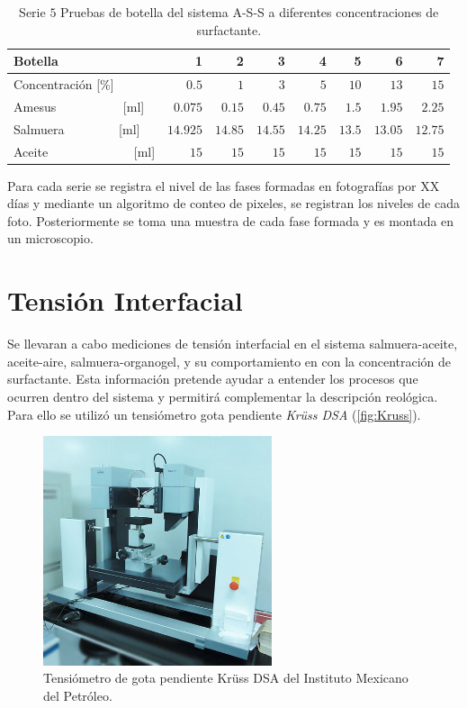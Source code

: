  \begin{table}[H]
    \caption[Pruebas de botella]{Serie $5$ Pruebas de botella del sistema A-S-S a diferentes concentraciones de surfactante.}
    \centering \footnotesize
    \begin{tabulary}{1.1\textwidth}{L |R|R|R|R|R|R|R}
        \toprule
        Botella & \textbf{1} & \textbf{2} & \textbf{3} & \textbf{4} & \textbf{5} & \textbf{6} & \textbf{7}  \\
        \midrule
        Concentración [\%] & $0.5$  & $1$ & $3$  & $5$ &$10$ & $13$ & $15$ \\
        Amesus ~~~~~~~~~~[ml] & $0.075$  & $0.15$ & $0.45$ & $0.75$ & $1.5$ & $1.95$ & $2.25$\\
        Salmuera ~~~~~~~~[ml] & $14.925$ & $14.85$ & $14.55$ & $14.25$ & $13.5$ & $13.05$ & $12.75$  \\
        Aceite ~~~~~~~~~~~~~[ml] & $15$ & $15$ & $15$ & $15$ & $15$ & $15$ & $15$  \\
        \midrule
        \bottomrule
    \end{tabulary}
    \label{tab:serie5}
\end{table}

Para cada serie se registra el nivel de las fases formadas en fotografías por XX días y mediante un algoritmo de conteo de pixeles, se registran los niveles de cada foto. Posteriormente se toma una muestra de cada fase formada y es montada en un microscopio.

\section{Tensión Interfacial}
Se llevaran a cabo mediciones de tensión interfacial en el sistema salmuera-aceite, aceite-aire, salmuera-organogel, y su comportamiento en con la concentración de surfactante. Esta información pretende ayudar a entender los procesos que ocurren dentro del sistema y permitirá complementar la descripción reológica. Para ello se utilizó un tensiómetro gota pendiente \emph{Krüss DSA} (\autoref{fig:Kruss}).
\begin{figure}\centering
    \includegraphics[width=0.6\textwidth]{Graphics/Kruss.jpg}
    \caption[Tensiómetro de gota]{Tensiómetro de gota pendiente Krüss DSA del Instituto Mexicano del Petróleo.}
    \label{fig:Kruss}
\end{figure}

